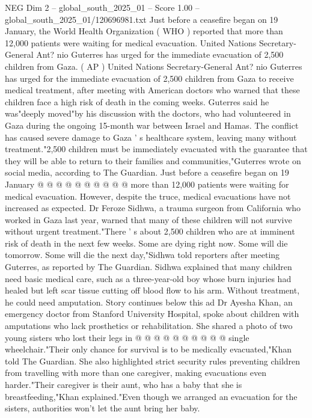 \begin{textsample}{NEG Dim 2 – global\_south\_2025\_01 – Score 1.00 – global\_south\_2025\_01/120696981.txt}  \label{ex:f2_neg_117}
Just before a ceasefire began on 19 January, the World Health Organization ( WHO ) reported that more than 12,000 patients were waiting for medical evacuation.
United Nations Secretary-General Ant? nio Guterres has urged for the immediate evacuation of 2,500 children from Gaza. ( AP ) United Nations Secretary-General Ant? nio Guterres has urged for the immediate evacuation of 2,500 children from Gaza to receive medical treatment, after meeting with American doctors who warned that these children face a high risk of death in the coming weeks.
Guterres said he was"deeply moved"by his discussion with the doctors, who had volunteered in Gaza during the ongoing 15-month war between Israel and Hamas.
The conflict has caused severe damage to Gaza ' s healthcare system, leaving many without treatment."2,500 children must be immediately evacuated with the guarantee that they will be able to return to their families and communities,"Guterres wrote on social media, according to The Guardian.
Just before a ceasefire began on 19 January @ @ @ @ @ @ @ @ @ @ more than 12,000 patients were waiting for medical evacuation.
However, despite the truce, medical evacuations have not increased as expected.
Dr Feroze Sidhwa, a trauma surgeon from California who worked in Gaza last year, warned that many of these children will not survive without urgent treatment."There ' s about 2,500 children who are at imminent risk of death in the next few weeks.
Some are dying right now.
Some will die tomorrow.
Some will die the next day,"Sidhwa told reporters after meeting Guterres, as reported by The Guardian.
Sidhwa explained that many children need basic medical care, such as a three-year-old boy whose burn injuries had healed but left scar tissue cutting off blood flow to his arm.
Without treatment, he could need amputation.
Story continues below this ad Dr Ayesha Khan, an emergency doctor from Stanford University Hospital, spoke about children with amputations who lack prosthetics or rehabilitation.
She shared a photo of two young sisters who lost their legs in @ @ @ @ @ @ @ @ @ @ single wheelchair."Their only chance for survival is to be medically evacuated,"Khan told The Guardian.
She also highlighted strict security rules preventing children from travelling with more than one caregiver, making evacuations even harder."Their caregiver is their aunt, who has a baby that she is breastfeeding,"Khan explained."Even though we arranged an evacuation for the sisters, authorities won't let the aunt bring her baby.

\end{textsample}

